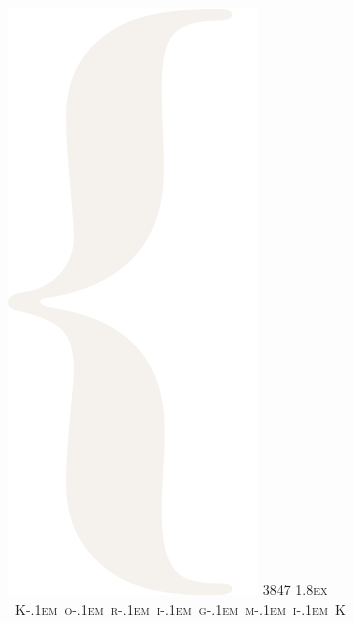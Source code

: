 \makeatletter
\def\logosmaller#1{%
    \hbox{\sbox\z@ T%
        \vbox to\ht\z@{\hbox{\check@mathfonts
                \fontsize\sf@size\z@
                \math@fontsfalse\selectfont #1}\vss}}}

\newcommand\lecture{%
    L\kern-.2em%
    \logosmaller{E}\kern-.1em%
    C\kern-.2em%
    \raise0.5ex\hbox{T}\kern-.23em%
    \hbox{U}\kern-.1em%
    \lower0.1ex\logosmaller{R}\kern-.1em%
    E\@}

\newcommand\korigamik{%
    K\kern-.1em%
    o\kern-.1em%
    r\kern-.1em%
    i\kern-.1em%
    g\kern-.1em%
    m\kern-.1em%
    i\kern-.1em%
    K\@}

\newcommand\HUGE{\@setfontsize\Huge{38}{47}}

\begin{titlepage}
    \center
    \includegraphics[scale=.15]{images/left.png}
    \textsc{\HUGE \color{purple} \raise1.8ex \hbox{\korigamik}}

\end{titlepage}
